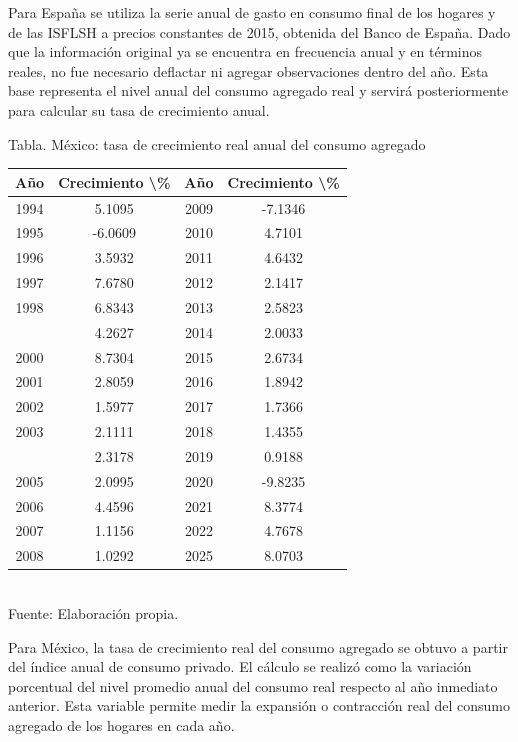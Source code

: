 \documentclass{article}\usepackage[]{graphicx}\usepackage[]{xcolor}
\begin{document}
Para España se utiliza la serie anual de gasto en consumo final de los hogares y de las ISFLSH a precios constantes de 2015, obtenida del Banco de España. Dado que la información original ya se encuentra en frecuencia anual y en términos reales, no fue necesario deflactar ni agregar observaciones dentro del año. Esta base representa el nivel anual del consumo agregado real y servirá posteriormente para calcular su tasa de crecimiento anual.



\begin{center}
Tabla. México: tasa de crecimiento real anual del consumo agregado
\end{center}
\begin{center}

\begin{tabular}{cccc}
\toprule
Año & Crecimiento \textbackslash{}\% & Año & Crecimiento \textbackslash{}\%\\
\midrule
1994 & 5.1095 & 2009 & -7.1346\\
1995 & -6.0609 & 2010 & 4.7101\\
1996 & 3.5932 & 2011 & 4.6432\\
1997 & 7.6780 & 2012 & 2.1417\\
1998 & 6.8343 & 2013 & 2.5823\\
\addlinespace
1999 & 4.2627 & 2014 & 2.0033\\
2000 & 8.7304 & 2015 & 2.6734\\
2001 & 2.8059 & 2016 & 1.8942\\
2002 & 1.5977 & 2017 & 1.7366\\
2003 & 2.1111 & 2018 & 1.4355\\
\addlinespace
2004 & 2.3178 & 2019 & 0.9188\\
2005 & 2.0995 & 2020 & -9.8235\\
2006 & 4.4596 & 2021 & 8.3774\\
2007 & 1.1156 & 2022 & 4.7678\\
2008 & 1.0292 & 2025 & 8.0703\\
\bottomrule
\end{tabular}
\\[0.3em]
{\footnotesize Fuente: Elaboración propia.}
\end{center}


Para México, la tasa de crecimiento real del consumo agregado se obtuvo a partir del índice anual de consumo privado. El cálculo se realizó como la variación porcentual del nivel promedio anual del consumo real respecto al año inmediato anterior. Esta variable permite medir la expansión o contracción real del consumo agregado de los hogares en cada año.
\end{document}
